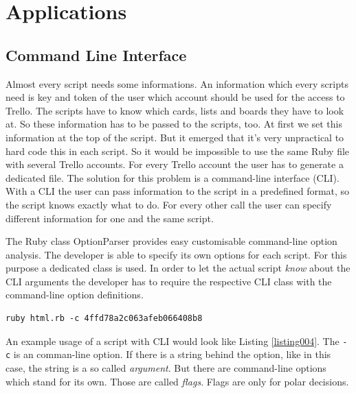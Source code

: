 
\chapter{Applications}

\section{Command Line Interface}\label{cli}
Almost every script needs some informations. An information which every scripts need is key and token of the user which account should be used for the access to Trello. The scripts have to know which cards, lists and boards they have to look at. So these information has to be passed to the scripts, too. At first we set this information at the top of the script. But it emerged that it's very unpractical to hard code this in each script. So it would be impossible to use the same Ruby file with several Trello accounts. For every Trello account the user has to generate a dedicated file. The solution for this problem is a command-line interface (CLI). With a CLI the user can pass information to the script in a predefined format, so the script knows exactly what to do. For every other call the user can specify different information for one and the same script.

The Ruby class OptionParser\cite{ruby:optionparser} provides easy customisable command-line option analysis. The developer is able to specify its own options for each script. For this purpose a dedicated class is used. 
In order to let the actual script \emph{know} about the CLI arguments the developer has to require the respective CLI class with the command-line option definitions.

\begin{lstlisting}[aboveskip=1\baselineskip, style=bash, caption=Example usage of a script with CLI., label=listing004]
ruby html.rb -c 4ffd78a2c063afeb066408b8
\end{lstlisting}

An example usage of a script with CLI would look like Listing \ref{listing004}. The \texttt{-c} is an comman-line option. If there is a string behind the option, like in this case, the string is a so called \emph{argument}. But there are command-line options which stand for its own. Those are called \emph{flags}. Flags are only for polar decisions.

